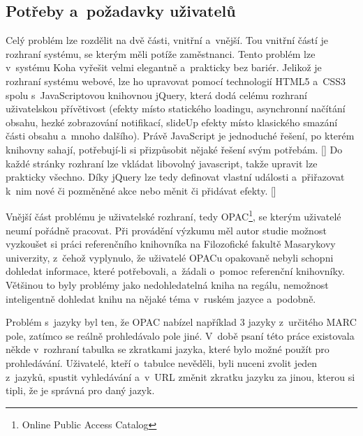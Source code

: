 \documentclass[
	11pt, oneside, printed, final, palatino, monochrome
	microtype,
	table,   %
	lof,     %
	lot     %
]{fithesis3}
\newcommand{\citepages}[2]{[\cite[#1]{#2}]}
\begin{document}
{\subsection{Potřeby a~požadavky uživatelů}
Celý problém lze rozdělit na dvě části, vnitřní a~vnější. Tou vnitřní částí je rozhraní systému, se kterým měli potíže zaměstnanci. Tento problém lze v~systému Koha vyřešit velmi elegantně a~prakticky bez bariér. Jelikož je rozhraní systému webové, lze ho upravovat pomocí technologií HTML5 a~CSS3 spolu s~JavaScriptovou knihovnou jQuery, která dodá celému rozhraní uživatelskou přívětivost (efekty místo statického loadingu, asynchronní načítání obsahu, hezké zobrazování notifikací, slideUp efekty místo klasického smazání části obsahu a~mnoho dalšího). Právě JavaScript je jednoduché řešení, po kterém knihovny sahají, potřebují-li si přizpůsobit nějaké řešení svým potřebám. \citepages{80-82}{Denar2015thesis} Do každé stránky rozhraní lze vkládat libovolný javascript, takže upravit lze prakticky všechno. Díky jQuery lze tedy definovat  vlastní události a~přiřazovat k~nim nové či pozměněné akce nebo měnit či přidávat efekty. \citepages{3-9}{IYiYMQHMhgWYsu4q}

Vnější část problému je uživatelské rozhraní, tedy OPAC\footnote{Online Public Access Catalog
}, se kterým uživatelé neumí pořádně pracovat. Při provádění výzkumu měl autor studie možnost vyzkoušet si práci referenčního knihovníka na Filozofické fakultě Masarykovy univerzity, z~čehož vyplynulo, že uživatelé OPACu opakovaně nebyli schopni dohledat informace, které potřebovali, a~žádali o~pomoc referenční knihovníky. Většinou to byly problémy jako nedohledatelná kniha na regálu, nemožnost inteligentně dohledat knihu na nějaké téma v~ruském jazyce a~podobně.

Problém s~jazyky byl ten, že OPAC nabízel například 3 jazyky z~určitého MARC pole, zatímco se reálně prohledávalo pole jiné. V~době psaní této práce existovala někde v~rozhraní tabulka se zkratkami jazyka, které bylo možné použít pro prohledávání. Uživatelé, kteří o~tabulce nevěděli, byli nuceni zvolit jeden z~jazyků, spustit vyhledávání a~v~URL změnit zkratku jazyku za jinou, kterou si tipli, že je správná pro daný jazyk.

}
\end{document}
